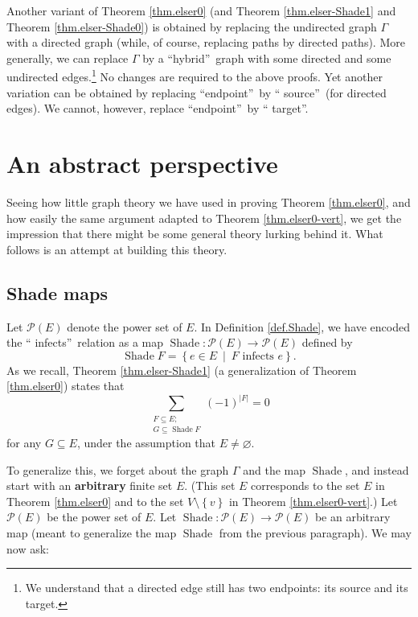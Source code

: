 \documentclass[numbers=enddot,12pt,final,onecolumn]{scrartcl}%
\theoremstyle{definition}
\let\sumnonlimits\sum
\renewcommand{\sum}{\sumnonlimits\limits}
\begin{document}
Another variant of Theorem \ref{thm.elser0} (and Theorem
\ref{thm.elser-Shade1} and Theorem \ref{thm.elser-Shade0}) is obtained by
replacing the undirected graph $\Gamma$ with a directed graph (while, of
course, replacing paths by directed paths). More generally, we can replace
$\Gamma$ by a \textquotedblleft hybrid\textquotedblright\ graph with some
directed and some undirected edges.\footnote{We understand that a directed
edge still has two endpoints: its source and its target.} No changes are
required to the above proofs. Yet another variation can be obtained by
replacing \textquotedblleft endpoint\textquotedblright\ by \textquotedblleft
source\textquotedblright\ (for directed edges). We cannot, however, replace
\textquotedblleft endpoint\textquotedblright\ by \textquotedblleft
target\textquotedblright.


\section{\label{sec.abstract}An abstract perspective}

Seeing how little graph theory we have used in proving Theorem
\ref{thm.elser0}, and how easily the same argument adapted to Theorem
\ref{thm.elser0-vert}, we get the impression that there might be some general
theory lurking behind it. What follows is an attempt at building this theory.

\subsection{Shade maps}

Let $\mathcal{P}\left(  E\right)  $ denote the power set of $E$. In Definition
\ref{def.Shade}, we have encoded the \textquotedblleft
infects\textquotedblright\ relation as a map $\operatorname*{Shade}%
:\mathcal{P}\left(  E\right)  \rightarrow\mathcal{P}\left(  E\right)  $
defined by%
\[
\operatorname*{Shade}F=\left\{  e\in E\ \mid\ F\text{ infects }e\right\}  .
\]
As we recall, Theorem \ref{thm.elser-Shade1} (a generalization of Theorem
\ref{thm.elser0}) states that
\begin{equation}
\sum_{\substack{F\subseteq E;\\G\subseteq\operatorname*{Shade}F}}\left(
-1\right)  ^{\left\vert F\right\vert }=0 \label{eq.Shade.goal}%
\end{equation}
for any $G\subseteq E$, under the assumption that $E\neq\varnothing$.

To generalize this, we forget about the graph $\Gamma$ and the map
$\operatorname*{Shade}$, and instead start with an \textbf{arbitrary} finite
set $E$. (This set $E$ corresponds to the set $E$ in Theorem \ref{thm.elser0}
and to the set $V\setminus\left\{  v\right\}  $ in Theorem
\ref{thm.elser0-vert}.) Let $\mathcal{P}\left(  E\right)  $ be the power set
of $E$. Let $\operatorname*{Shade}:\mathcal{P}\left(  E\right)  \rightarrow
\mathcal{P}\left(  E\right)  $ be an arbitrary map (meant to generalize the
map $\operatorname*{Shade}$ from the previous paragraph). We may now ask:
\end{document}
